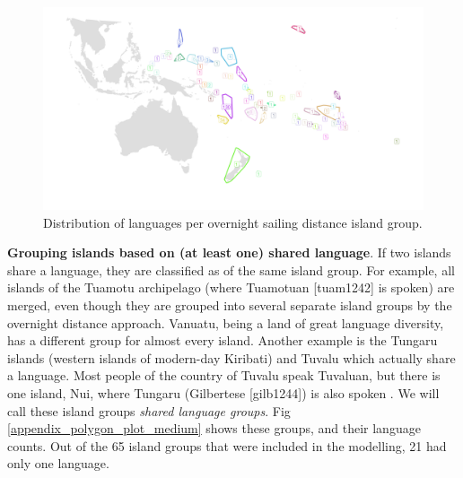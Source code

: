 \documentclass[12pt,letterpaper]{article}
\begin{document}
\begin{figure}
\centering
\includegraphics[width=\textwidth]{polygon_SBZR_group_map}
\caption{{Distribution of languages per overnight sailing distance island group.}}
\label{appendix_polygon_plot_SBZR}
\end{figure}

\textbf{Grouping islands based on (at least one) shared language}. If two islands share a language, they are classified as of the same island group. For example, all islands of the Tuamotu archipelago (where Tuamotuan [tuam1242] is spoken) are merged, even though they are grouped into several separate island groups by the overnight distance approach. Vanuatu, being a land of great language diversity, has a different group for almost every island. Another example is the Tungaru islands (western islands of modern-day Kiribati) and Tuvalu which actually share a language. Most people of the country of Tuvalu speak Tuvaluan, but there is one island, Nui, where Tungaru (Gilbertese [gilb1244]) is also spoken \citep{faaniu1983tuvalu, macdonald_2020, omniglot_tuvaluan}. We will call these island groups \textit{shared language groups}. Fig \ref{appendix_polygon_plot_medium} shows these groups, and their language counts. Out of the 65 island groups that were included in the modelling, 21 had only one language.
\end{document}
